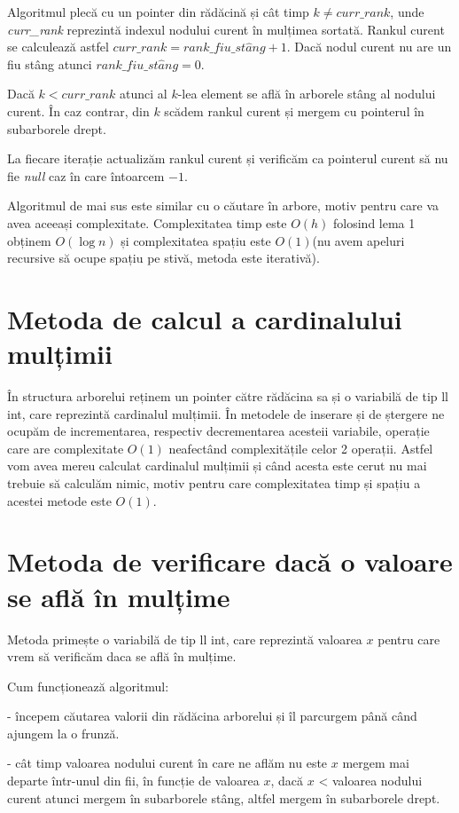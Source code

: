 \documentclass[]{report}
\begin{document}
	Algoritmul plecă cu un pointer din rădăcină și cât timp $k\neq curr\_rank$,
	unde \emph{curr\_rank} reprezintă indexul nodului curent în mulțimea sortată.
	Rankul curent se calculează astfel $curr\_rank = rank\_fiu\_st\hat{a}ng + 1$.
	Dacă nodul curent nu are un fiu stâng atunci $rank\_fiu\_st\hat{a}ng = 0$.

	Dacă $k < curr\_rank$ atunci al $k$-lea element se află în arborele stâng
	al nodului curent. În caz contrar, din $k$ scădem rankul curent și mergem
	cu pointerul în subarborele drept.

	La fiecare iterație actualizăm rankul curent și verificăm ca pointerul 
	curent să nu fie \emph{null} caz în care întoarcem $-1$.

	Algoritmul de mai sus este similar cu o căutare în arbore, motiv pentru care
	va avea aceeași complexitate. Complexitatea timp este $O(h)$ folosind lema 1
	obținem $O(\log n)$ și complexitatea spațiu este $O(1)$(nu avem apeluri 
	recursive să ocupe spațiu pe stivă, metoda este iterativă).

	\section*{Metoda de calcul a cardinalului mulțimii}

	În structura arborelui reținem un pointer către rădăcina sa și o variabilă
	de tip ll int, care reprezintă cardinalul mulțimii. În metodele de inserare
	și de ștergere ne ocupăm de incrementarea, respectiv decrementarea acesteii
	variabile, operație care are complexitate $O(1)$ neafectând complexitățile
	celor 2 operații. Astfel vom avea mereu calculat cardinalul mulțimii și
	când acesta este cerut nu mai trebuie să calculăm nimic, motiv pentru care
	complexitatea timp și spațiu a acestei metode este $O(1)$.

	\section*{Metoda de verificare dacă o valoare se află în mulțime}

	Metoda primește o variabilă de tip ll int, care reprezintă valoarea $x$
	pentru care vrem să verificăm daca se află în mulțime.
	
	Cum funcționează algoritmul:

	- începem căutarea valorii din rădăcina arborelui și îl parcurgem până când
	ajungem la o frunză.

	- cât timp valoarea nodului curent în care ne aflăm nu este $x$ mergem mai
	departe într-unul din fii, în funcție de valoarea $x$, dacă $x$ < valoarea
	nodului curent atunci mergem în subarborele stâng, altfel mergem în 
	subarborele	drept.
\end{document}
